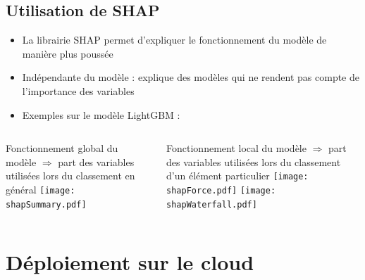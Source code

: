 \documentclass[8pt,aspectratio=169,hyperref={unicode=true}]{beamer}
\begin{document}
\subsection{Utilisation de SHAP}
\begin{frame}{\insertsection}{\insertsubsection}
    \begin{itemize}
        \item La librairie SHAP permet d'expliquer le fonctionnement du modèle de manière plus poussée
        \item Indépendante du modèle : explique des modèles qui ne rendent pas compte de l'importance des variables
        \item Exemples sur le modèle LightGBM :
    \end{itemize}
    \begin{columns}[t]
        \begin{column}{.5\textwidth}
            Fonctionnement global du modèle $\Longrightarrow$ part des variables utilisées lors du classement en général
            \texttt{[image: shapSummary.pdf]}
        \end{column}
        \begin{column}{.5\textwidth}
            Fonctionnement local du modèle $\Longrightarrow$ part des variables utilisées lors du classement d'un élément particulier
            \texttt{[image: shapForce.pdf]}
            \texttt{[image: shapWaterfall.pdf]}
        \end{column}
    \end{columns}
\end{frame}


\section{Déploiement sur le cloud}
\end{document}
